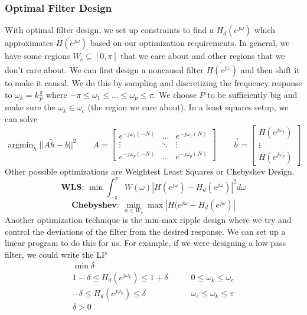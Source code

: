 \documentclass{article}
\DeclareMathOperator*{\argmin}{argmin}
\begin{document}
\subsubsection{Optimal Filter Design}
With optimal filter design, we set up constraints to find a $H_d(e^{j\omega})$ which approximates $H(e^{j\omega})$ based on our optimization requirements.
In general, we have some regions $W_c\subseteq [0, \pi]$ that we care about and other regions that we don't care about. We can first design a noncausal filter $\tilde{H(e^{j\omega})}$ and then shift it to make it causal.
We do this by sampling and discretizing the frequency response to $\omega_k = k\frac{\pi}{p}$ where $-\pi \le \omega_1 \le ... \le \omega_p \le \pi$.
We choose $P$ to be sufficiently big and make sure the $\omega_k \in \omega_c$ (the region we care about).
In a least squares setup, we can solve
\[
  \argmin_{\tilde{h}}||A\tilde{h}-b||^2 \qquad A = \left[
    \begin{array}{ccc}
      e^{-j\omega_1(-N)} & ... & e^{-j\omega_1(N)}\\
      \vdots & \ddots & \vdots\\
      e^{-j\omega_p(-N)} & ... & e^{-j\omega_p(N)}
    \end{array}
    \right]\qquad
    \vec{b} = \left[
    \begin{array}{c}
      H(e^{j\omega_1})\\
      \vdots\\
      H(e^{j\omega_p})
    \end{array}
    \right]
\]
Other possible optimizations are Weightest Least Squares or Chebyshev Design.
$$\textbf{WLS: }\min\int_{-\pi}^{\pi}W(\omega)|H(e^{j\omega}) - H_d(e^{j\omega})|^2d\omega$$
$$\textbf{Chebyshev: }\min_{w\in W_c} \max|H(e^{j\omega}-H_d(e^{j\omega})|$$
Another optimization technique is the min-max ripple design where we try and control the deviations of the filter from the desired response.
We can set up a linear program to do this for us. For example, if we were designing a low pass filter, we could write the LP
\begin{align*}
  \min \delta\\
  1-\delta \le H_d(e^{j\omega_k})\le 1+\delta &\qquad 0\le \omega_k \le \omega_c\\
  -\delta \le H_d(e^{j\omega_k})\le \delta &\qquad \omega_c\le \omega_k \le \pi\\
  \delta > 0
\end{align*}
\end{document}
